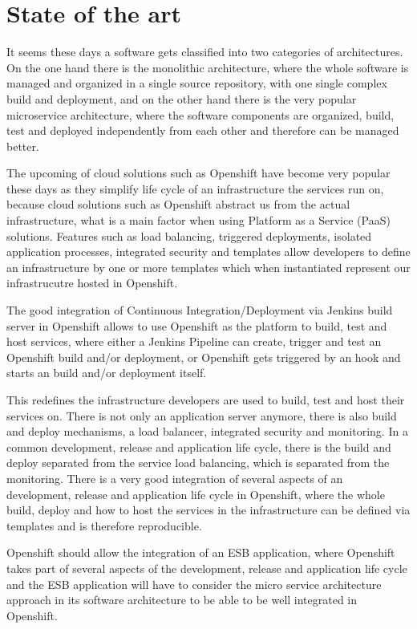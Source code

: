 \section{State of the art}
\label{sec:state-of-the-art}
It seems these days a software gets classified into two categories of architectures. On the one hand there is the monolithic architecture, where the whole software is managed and organized in a single source repository, with one single complex build and deployment, and on the other hand there is the very popular microservice architecture, where the software components are organized, build, test and deployed independently from each other and therefore can be managed better.

The upcoming of cloud solutions such as Openshift have become very popular these days as they simplify life cycle of an infrastructure the services run on, because cloud solutions such as Openshift abstract us from the actual infrastructure, what is a main factor when using Platform as a Service (PaaS) solutions. Features such as load balancing, triggered deployments, isolated application processes, integrated security and templates allow developers to define an infrastructure by one or more templates which when instantiated represent our infrastrucutre hosted in Openshift.

The good integration of Continuous Integration/Deployment via Jenkins build server in Openshift allows to use Openshift as the platform to build, test and host services, where either a Jenkins Pipeline can create, trigger and test an Openshift build and/or deployment, or Openshift gets triggered by an hook and starts an build and/or deployment itself.

This redefines the infrastructure developers are used to build, test and host their services on. There is not only an application server anymore, there is also build and deploy mechanisms, a load balancer, integrated security and monitoring. In a common development, release and application life cycle, there is the build and deploy separated from the service load balancing, which is separated from the monitoring. There is a very good integration of several aspects of an development, release and application life cycle in Openshift, where the whole build, deploy and how to host the services in the infrastructure can be defined via templates and is therefore reproducible.

Openshift should allow the integration of an ESB application, where Openshift takes part of several aspects of the development, release and application life cycle and the ESB application will have to consider the micro service architecture approach in its software architecture to be able to be well integrated in Openshift.

